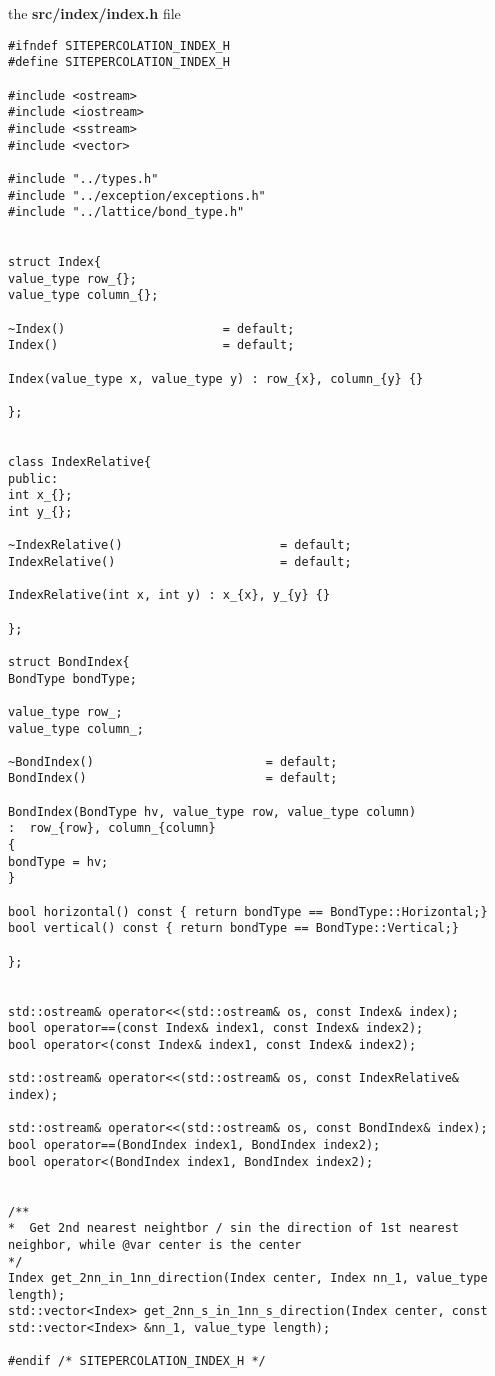 
the \textbf{src/index/index.h} file
\begin{lstlisting}[style=CStyle]
#ifndef SITEPERCOLATION_INDEX_H
#define SITEPERCOLATION_INDEX_H

#include <ostream>
#include <iostream>
#include <sstream>
#include <vector>

#include "../types.h"
#include "../exception/exceptions.h"
#include "../lattice/bond_type.h"


struct Index{
value_type row_{};
value_type column_{};

~Index()                      = default;
Index()                       = default;

Index(value_type x, value_type y) : row_{x}, column_{y} {}

};


class IndexRelative{
public:
int x_{};
int y_{};

~IndexRelative()                      = default;
IndexRelative()                       = default;

IndexRelative(int x, int y) : x_{x}, y_{y} {}

};

struct BondIndex{
BondType bondType;

value_type row_;
value_type column_;

~BondIndex()                        = default;
BondIndex()                         = default;

BondIndex(BondType hv, value_type row, value_type column)
:  row_{row}, column_{column}
{
bondType = hv;
}

bool horizontal() const { return bondType == BondType::Horizontal;}
bool vertical() const { return bondType == BondType::Vertical;}

};


std::ostream& operator<<(std::ostream& os, const Index& index);
bool operator==(const Index& index1, const Index& index2);
bool operator<(const Index& index1, const Index& index2);

std::ostream& operator<<(std::ostream& os, const IndexRelative& index);

std::ostream& operator<<(std::ostream& os, const BondIndex& index);
bool operator==(BondIndex index1, BondIndex index2);
bool operator<(BondIndex index1, BondIndex index2);


/**
*  Get 2nd nearest neightbor / sin the direction of 1st nearest neighbor, while @var center is the center
*/
Index get_2nn_in_1nn_direction(Index center, Index nn_1, value_type length);
std::vector<Index> get_2nn_s_in_1nn_s_direction(Index center, const std::vector<Index> &nn_1, value_type length);

#endif /* SITEPERCOLATION_INDEX_H */
\end{lstlisting}


